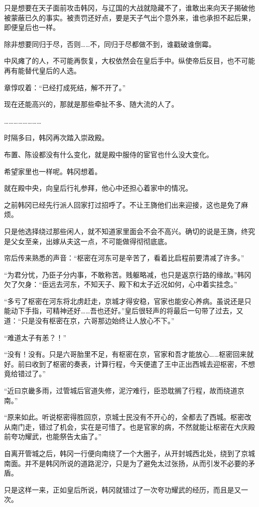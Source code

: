 只是想要在天子面前攻击韩冈，与辽国的大战就隐藏不了，谁敢出来向天子揭破他被蒙蔽已久的事实。被责罚还好点，要是天子气出个意外来，谁也承担不起后果，即便皇后也一样。

除非想要同归于尽，否则……不，同归于尽都做不到，谁戳破谁倒霉。

中风瘫了的人，不可能再恢复，大权依然会在皇后手中。纵使帝后反目，也不可能再有能替代皇后的人选。

章惇叹着：“已经打成死结，解不开了。”

现在还能高兴的，那就是那些牵扯不多、随大流的人了。

……………………

时隔多曰，韩冈再次踏入崇政殿。

布置、陈设都没有什么变化，就是殿中服侍的宦官也什么没大变化。

希望家里也一样呢。韩冈想着。

就在殿中央，向皇后行礼参拜，他心中还担心着家中的情况。

之前韩冈已经先行派人回家打过招呼了。不让王旖他们出来迎接，这也是免了麻烦。

只是他选择绕过那些闲人，就不知道家里面会不会不高兴。确切的说是王旖，终究是父女至亲，出嫁从夫这一点，不可能做得彻彻底底。

帘后传来熟悉的声音：“枢密在河东可是辛苦了，看着比启程前要清减了许多。”

“为君分忧，乃臣子分内事，不敢称苦。贱躯略减，也只是返京行路的缘故。”韩冈欠了欠身：“臣远去河东，不知天子、殿下和太子近况如何，心中着实挂念。”

“多亏了枢密在河东将北虏赶走，京城才得安稳，官家也能安心养病。虽说还是只能动下手指，可精神还好……吾也还好。”皇后很轻声的将最后一句带了过去，又道：“只是没有枢密在京，六哥那边始终让人放心不下。”

“难道太子有恙？！”

“没有！没有。只是六哥胎里不足，有枢密在京，官家和吾才能放心……枢密回来就好。前曰收到了枢密的奏表，计算行程，今天便遣了王中正出西城去迎枢密，不想竟给错过了。”

“近曰京畿多雨，过管城后官道失修，泥泞难行，臣恐耽搁了行程，故而绕道京南。”

“原来如此。听说枢密得胜回京，京城士民没有不开心的，全都去了西城。枢密改从南门走，错过了机会，实在是可惜了。也是官家的病，不然就能让枢密在大庆殿前夸功耀武，也能祭告太庙了。”

自离开管城之后，韩冈一行便向南绕了一个大圈子，从开封城西北处，绕到了京城南面。并不是韩冈所说的道路泥泞，只是为了避免太过张扬，从而引发不必要的矛盾。

只是这样一来，正如皇后所说，韩冈就错过了一次夸功耀武的经历，而且是又一次。

